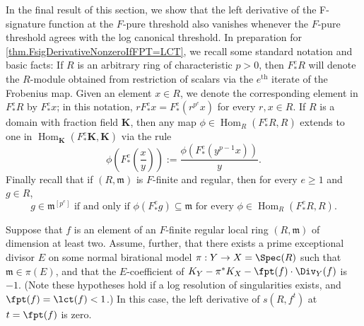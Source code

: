 \documentclass[11pt]{amsart}
\begin{document}
In the final result of this section, we show that the left derivative of the F-signature function at the $F$-pure threshold also vanishes whenever the $F$-pure threshold agrees with the log canonical threshold.  In preparation for \autoref{thm.FsigDerivativeNonzeroIfFPT=LCT}, we recall some standard notation and basic facts:  If $R$ is an arbitrary ring of characteristic $p>0$, then $F^e_{\ast} R$ will denote the $R$-module obtained from restriction of scalars via the $e^{\text{th}}$ iterate of the Frobenius map.  Given an element $x \in R$, we denote the corresponding element in $F^e_{\ast} R$ by $F^e_{\ast} x$; in this notation, $r F^e_{\ast} x = F^e_{\ast} (r^{p^e} x)$ for every $r,x \in R$.  If $R$ is a domain with fraction field $\mathbf{K}$, then any map $\phi \in \operatorname{Hom}_R(F^e_{\ast} R, R)$ extends to one in $\operatorname{Hom}_{\mathbf{K}}(F^e_{\ast} \mathbf{K}, \mathbf{K})$ via the rule
\[ \phi \left( F^e_{\ast} \left(\frac{x}{y} \right) \right):= \frac{ \phi( F^e_{\ast}(y^{p-1} x))}{y}. \]
Finally recall that if $(R, {\mathfrak{m}})$ is $F$-finite and regular, then for every $e \geq 1$ and $g \in R$,
\begin{equation}
\label{colonViaHom: e}
g \in {\mathfrak{m}}^{[p^e]} \text{ if and only if } \phi( F^e_{\ast} g) \subseteq {\mathfrak{m}} \text{ for every $\phi \in \operatorname{Hom}_R(F^e_{\ast} R, R)$.}
\end{equation}

\begin{theorem}
\label{thm.FsigDerivativeNonzeroIfFPT=LCT}
Suppose that $f$ is an element of an $F$-finite regular local ring $(R, {\mathfrak{m}})$ of dimension at least two.   Assume, further, that there exists a prime {exceptional} divisor $E$ on some normal birational model $\pi : Y \to X = \Spec(R)$ such that ${\mathfrak{m}} \in \pi(E)$, and that the $E$-coefficient of $K_Y - \pi^* K_X -  \fpt(f) \cdot  \Div_Y(f)$ is  $-1$.
(Note these hypotheses hold if a log resolution of singularities exists, and $\fpt(f) = \lct(f)<1$.)
In this case, the left derivative of $s(R, f^t)$ at $t=\fpt(f)$ is zero.
\end{theorem}
\end{document}

